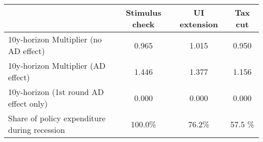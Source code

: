 \begin{tabular}{@{}lccc@{}} 
\toprule 
& Stimulus check    & UI extension    & Tax cut     \\  \midrule 
10y-horizon Multiplier (no AD effect) &0.965  & 1.015  & 0.950     \\ 
10y-horizon Multiplier (AD effect) &1.446  & 1.377  & 1.156     \\ 
10y-horizon (1st round AD effect only) &0.000  & 0.000  & 0.000     \\ 
Share of policy expenditure during recession &100.0\%  & 76.2\%  & 57.5 \%    \\ 
\end{tabular}  
